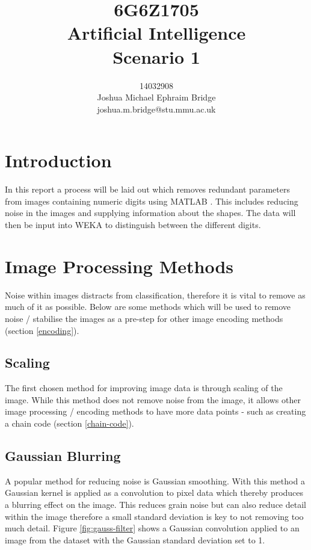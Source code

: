 \documentclass[12pt]{article}
\title{\vspace{2cm}6G6Z1705\\\textbf{Artificial Intelligence}\\\vspace{2cm}Scenario 1\\\vspace{2cm}}
\author{14032908\\Joshua Michael Ephraim Bridge\\joshua.m.bridge@stu.mmu.ac.uk\\\vspace{1cm}}
\begin{document}
\maketitle

\newpage

\onehalfspacing

\section{Introduction}
In this report a process will be laid out which removes redundant parameters from images containing numeric digits using MATLAB \citep{matlab}. This includes reducing noise in the images and supplying information about the shapes. The data will then be input into WEKA \citep{hall2009weka} to distinguish between the different digits.

\section{Image Processing Methods}
  Noise within images distracts from classification, therefore it is vital to remove as much of it as possible. Below are some methods which will be used to remove noise / stabilise the images as a pre-step for other image encoding methods (section \ref{encoding}).

  \subsection{Scaling}
    The first chosen method for improving image data is through scaling of the image. While this method does not remove noise from the image, it allows other image processing / encoding methods to have more data points - such as creating a chain code (section \ref{chain-code}).

  \subsection{Gaussian Blurring} \label{sec:gauss-blur}
    A popular method for reducing noise is Gaussian smoothing. With this method a Gaussian kernel is applied as a convolution to pixel data which thereby produces a blurring effect on the image. This reduces grain noise but can also reduce detail within the image therefore a small standard deviation is key to not removing too much detail. Figure \ref{fig:gauss-filter} shows a Gaussian convolution applied to an image from the dataset with the Gaussian standard deviation set to 1.
\end{document}
